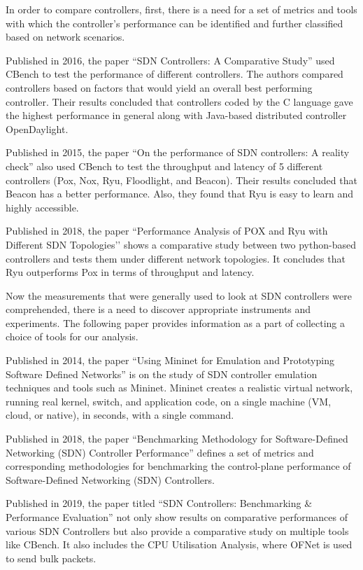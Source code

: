 In order to compare controllers, first, there is a need for a set of metrics and tools with which the controller's performance can be identified and further classified based on network scenarios.

Published in 2016, the paper ``SDN Controllers: A Comparative Study'' \cite{adaptiveroute2006}  used CBench to test the performance of different controllers. The authors compared controllers based on factors that would yield an overall best performing controller. Their results concluded that controllers coded by the C language gave the highest performance in general along with Java-based distributed controller OpenDaylight.

Published in 2015, the paper ``On the performance of SDN controllers: A reality check'' \cite{realitycheck}  also used CBench to test the throughput and latency of 5 different controllers (Pox, Nox, Ryu, Floodlight, and Beacon). Their results concluded that Beacon has a better performance. Also, they found that Ryu is easy to learn and highly accessible.

Published in 2018, the paper ``Performance Analysis of POX and Ryu with Different SDN Topologies’’ shows a comparative study between two python-based controllers and tests them under different network topologies. It concludes that Ryu outperforms Pox in terms of throughput and latency.

Now the measurements that were generally used to look at SDN controllers were comprehended, there is a need to discover appropriate instruments and experiments. The following paper provides information as a part of collecting a choice of tools for our analysis.

Published in 2014, the paper ``Using Mininet for Emulation and Prototyping Software Defined Networks'' \cite{mininet2014} is on the study of SDN controller emulation techniques and tools such as Mininet. Mininet creates a realistic virtual network, running real kernel, switch, and application code, on a single machine (VM, cloud, or native), in seconds, with a single command.

Published in 2018, the paper ``Benchmarking Methodology for Software-Defined Networking (SDN) Controller Performance'' \cite{rfc8456} defines a set of metrics and corresponding methodologies for benchmarking the control-plane performance of Software-Defined Networking (SDN) Controllers.

Published in 2019, the paper titled ``SDN Controllers: Benchmarking \& Performance Evaluation'' \cite{zhu2019sdn} not only show results on comparative performances of various SDN Controllers but also provide a comparative study on multiple tools like CBench. It also includes the CPU Utilisation Analysis, where OFNet is used to send bulk packets.

